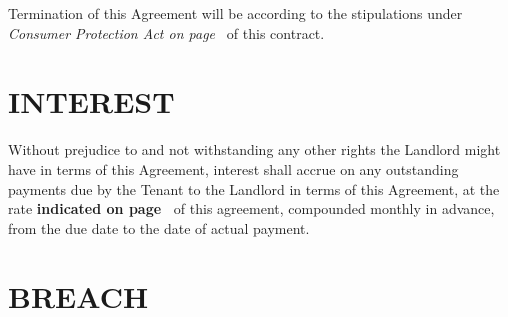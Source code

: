 \documentclass[11pt]{article}
\begin{document}
Termination of this Agreement will be according to the stipulations under \textit{Consumer Protection Act on page~\pageref{sec:consumer-protection-act}} of this contract.

\section{\uppercase{interest}}
\label{sec:interest}

Without prejudice to and not withstanding any other rights the Landlord might have in terms of this Agreement, interest shall accrue on any outstanding payments due by the Tenant to the Landlord in terms of this Agreement, at the rate \textbf{indicated on page~\pageref{input:interest}} of this agreement, compounded monthly in advance, from the due date to the date of actual payment.

\section{\uppercase{breach}}
\end{document}
